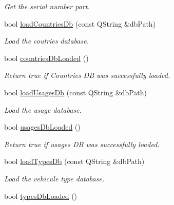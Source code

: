 \begin{DoxyCompactItemize}
\begin{DoxyCompactList}\small\item\em Get the serial number part. \end{DoxyCompactList}\item 
bool \hyperlink{classmdt_uic_number_ad7bb1405db0de8f1d247fa5a7bdb19ce}{loadCountriesDb} (const QString \&dbPath)
\begin{DoxyCompactList}\small\item\em Load the coutries database. \end{DoxyCompactList}\item 
\hypertarget{classmdt_uic_number_a36eec09823de2d9848e9f7b8135fa59d}{
bool \hyperlink{classmdt_uic_number_a36eec09823de2d9848e9f7b8135fa59d}{countriesDbLoaded} ()}
\label{classmdt_uic_number_a36eec09823de2d9848e9f7b8135fa59d}

\begin{DoxyCompactList}\small\item\em Return true if Countries DB was successfully loaded. \end{DoxyCompactList}\item 
bool \hyperlink{classmdt_uic_number_af496e1fb75f696258287754fe2607561}{loadUsagesDb} (const QString \&dbPath)
\begin{DoxyCompactList}\small\item\em Load the usage database. \end{DoxyCompactList}\item 
\hypertarget{classmdt_uic_number_a2090c7d80c75d1db42d271f82ff8f598}{
bool \hyperlink{classmdt_uic_number_a2090c7d80c75d1db42d271f82ff8f598}{usagesDbLoaded} ()}
\label{classmdt_uic_number_a2090c7d80c75d1db42d271f82ff8f598}

\begin{DoxyCompactList}\small\item\em Return true if usages DB was successfully loaded. \end{DoxyCompactList}\item 
bool \hyperlink{classmdt_uic_number_a98c879c7bb7412caac4612a46586b76d}{loadTypesDb} (const QString \&dbPath)
\begin{DoxyCompactList}\small\item\em Load the vehicule type database. \end{DoxyCompactList}\item 
\hypertarget{classmdt_uic_number_a39fb254207bfe6dd6eaade2711030dac}{
bool \hyperlink{classmdt_uic_number_a39fb254207bfe6dd6eaade2711030dac}{typesDbLoaded} ()}
\label{classmdt_uic_number_a39fb254207bfe6dd6eaade2711030dac}


\end{DoxyCompactItemize}
